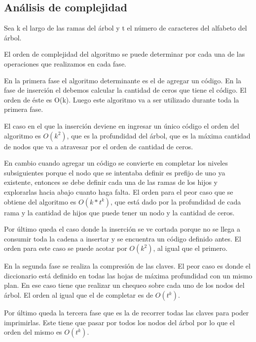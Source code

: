 \subsection*{Análisis de complejidad}

Sea k el largo de las ramas del árbol y t el número de caracteres del alfabeto del árbol.

El orden de complejidad del algoritmo se puede determinar por cada una de las operaciones que realizamos
en cada fase. 

En la primera fase el algoritmo determinante es el de agregar un código. 
En la fase de inserción el debemos calcular la cantidad de ceros que tiene el código. 
El orden de éste es O(k). Luego este algoritmo va a ser utilizado durante toda la primera fase.

El caso en el que la inserción deviene en ingresar un único código el
orden del algoritmo es $O(k^2)$, que es la profundidad del árbol, que es la
máxima cantidad de nodos que va a atravesar por el orden de cantidad de ceros.

En cambio cuando agregar un código se convierte en completar los niveles
subsiguientes porque el nodo que se intentaba definir es prefijo de uno ya
existente, entonces se debe definir cada una de las ramas de los hijos y
explorarlas hacia abajo cuanto haga falta. El orden para el peor caso que se
obtiene del algoritmo es $O(k*t^k)$, que está dado por la profundidad de cada
rama y la cantidad de hijos que puede tener un nodo y la cantidad de ceros.

Por último queda el caso donde la inserción se ve cortada porque no
se llega a consumir toda la cadena a insertar y se encuentra un código
definido antes. El orden para este caso se puede acotar por $O(k^2)$, al igual
que el primero.

En la segunda fase se realiza la compresión de las claves. El peor caso es
donde el diccionario está definido en todas las hojas de máxima profundidad
con un mismo plan. En ese caso tiene que realizar un chequeo sobre cada uno
de los nodos del árbol. El orden al igual que el de completar es de $O(t^k)$.

Por último queda la tercera fase que es la de recorrer todas las claves para
poder imprimirlas. Este tiene que pasar por todos los nodos del árbol por lo que
el orden del mismo es $O(t^k)$.
